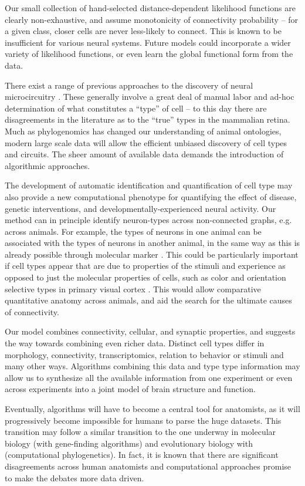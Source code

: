 \documentclass{nature}
\begin{document}
Our small collection of hand-selected distance-dependent likelihood
functions are clearly non-exhaustive, and assume monotonicity
of connectivity probability -- for a given class, closer cells
are never less-likely to connect. This is known to be insufficient
for various neural systems. Future models could incorporate
a wider variety of likelihood functions, or even learn the global
functional form from the data. 

There exist a range of previous approaches to the discovery of
neural microcircuitry . These
generally involve a great deal of manual labor and ad-hoc
determination of what constitutes a “type” of cell -- to this day
there are disagreements in the literature as to the “true” types in
the mammalian retina. Much as phylogenomics has changed our
understanding of animal ontologies, modern large scale data will allow
the efficient unbiased discovery of cell types and circuits. The sheer
amount of available data demands the introduction of algorithmic
approaches.

The development of automatic identification and quantification of cell
type may also provide a new computational phenotype for quantifying
the effect of disease, genetic interventions, and
developmentally-experienced neural activity. Our method can in
principle identify neuron-types across non-connected graphs,
e.g. across animals. For example, the types of neurons in one animal
can be associated with the types of neurons in another animal, in the
same way as this is already possible through molecular marker
\autocite{Brown2009}. This could be particularly important if cell
types appear that are due to properties of the stimuli and experience
as opposed to just the molecular properties of cells, such as color
and orientation selective types in primary visual cortex
\autocite{Sincich2005,Lennie2005}. This would allow comparative
quantitative anatomy across animals, and aid the search for the
ultimate causes of connectivity.

Our model combines connectivity, cellular, and synaptic properties, 
and suggests the way towards combining even richer data. Distinct cell
types differ in morphology, connectivity, transcriptomics, relation to
behavior or stimuli and many other ways. Algorithms combining this data and type type
information may allow us to synthesize all the available
information from one experiment or even across experiments into a
joint model of brain structure and function.

Eventually, algorithms will have to become a central tool for
anatomists, as it will progressively become impossible for humans to
parse the huge datasets. This transition may follow a similar
transition to the one underway in molecular biology (with gene-finding
algorithms) and evolutionary biology with (computational
phylogenetics).  In fact, it is known that there are significant
disagreements across human anatomists and computational approaches
promise to make the debates more data driven.
\end{document}
